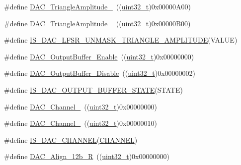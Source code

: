 \begin{DoxyCompactItemize}
\item 
\#define \hyperlink{group___d_a_c__lfsrunmask__triangleamplitude_gad33d28d7fcc09d84500ea9b6e6c5feed}{D\+A\+C\+\_\+\+Triangle\+Amplitude\+\_}~((\hyperlink{_p_e___types_8h_a33594304e786b158f3fb30289278f5af}{uint32\+\_\+t})0x00000\+A00)
\item 
\#define \hyperlink{group___d_a_c__lfsrunmask__triangleamplitude_ga3ce69f5a63a2464dc4b5f73cb6fe72f5}{D\+A\+C\+\_\+\+Triangle\+Amplitude\+\_}~((\hyperlink{_p_e___types_8h_a33594304e786b158f3fb30289278f5af}{uint32\+\_\+t})0x00000\+B00)
\item 
\#define \hyperlink{group___d_a_c__lfsrunmask__triangleamplitude_ga20f7c3c43f917f14593f0c478c2412e1}{I\+S\+\_\+\+D\+A\+C\+\_\+\+L\+F\+S\+R\+\_\+\+U\+N\+M\+A\+S\+K\+\_\+\+T\+R\+I\+A\+N\+G\+L\+E\+\_\+\+A\+M\+P\+L\+I\+T\+U\+DE}(V\+A\+L\+UE)
\item 
\#define \hyperlink{group___d_a_c__output__buffer_gab3f92803a8b6bc5fb3e4859908b5161f}{D\+A\+C\+\_\+\+Output\+Buffer\+\_\+\+Enable}~((\hyperlink{_p_e___types_8h_a33594304e786b158f3fb30289278f5af}{uint32\+\_\+t})0x00000000)
\item 
\#define \hyperlink{group___d_a_c__output__buffer_gad41f919d7141398cfdedf8218ce64450}{D\+A\+C\+\_\+\+Output\+Buffer\+\_\+\+Disable}~((\hyperlink{_p_e___types_8h_a33594304e786b158f3fb30289278f5af}{uint32\+\_\+t})0x00000002)
\item 
\#define \hyperlink{group___d_a_c__output__buffer_gaa5a56816d641129fb62d11133c9dcccd}{I\+S\+\_\+\+D\+A\+C\+\_\+\+O\+U\+T\+P\+U\+T\+\_\+\+B\+U\+F\+F\+E\+R\+\_\+\+S\+T\+A\+TE}(S\+T\+A\+TE)
\item 
\#define \hyperlink{group___d_a_c___channel__selection_gacf6585474ed2a302b69a3725daa91555}{D\+A\+C\+\_\+\+Channel\+\_}~((\hyperlink{_p_e___types_8h_a33594304e786b158f3fb30289278f5af}{uint32\+\_\+t})0x00000000)
\item 
\#define \hyperlink{group___d_a_c___channel__selection_ga0e9b0096866bb06e8a82b3e4e66943bb}{D\+A\+C\+\_\+\+Channel\+\_}~((\hyperlink{_p_e___types_8h_a33594304e786b158f3fb30289278f5af}{uint32\+\_\+t})0x00000010)
\item 
\#define \hyperlink{group___d_a_c___channel__selection_gafb2b9bdaccb3a5e3396925d7cba02cc3}{I\+S\+\_\+\+D\+A\+C\+\_\+\+C\+H\+A\+N\+N\+EL}(\hyperlink{samr21__xpro_200std__low__power__mode_200std__low__power__mode_8c_ace6a11e892466500d47d1f45f042bc53}{C\+H\+A\+N\+N\+EL})
\item 
\#define \hyperlink{group___d_a_c__data__alignment_ga0f2a6fc71aaf90a27b0caf1bd06e73f2}{D\+A\+C\+\_\+\+Align\+\_\+12b\+\_\+R}~((\hyperlink{_p_e___types_8h_a33594304e786b158f3fb30289278f5af}{uint32\+\_\+t})0x00000000)

\end{DoxyCompactItemize}
